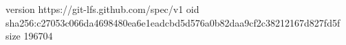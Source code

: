 version https://git-lfs.github.com/spec/v1
oid sha256:c27053c066da4698480ea6e1eadcbd5d576a0b82daa9cf2c38212167d827fd5f
size 196704
